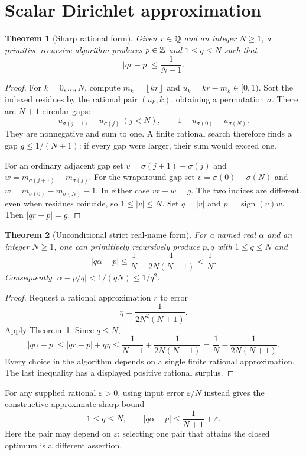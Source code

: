 \documentclass[11pt]{article}
\newtheorem{theorem}{Theorem}[section]
\theoremstyle{definition}\newtheorem{definition}[theorem]{Definition}
\theoremstyle{remark}\newtheorem{remark}[theorem]{Remark}
\newcommand{\floor}[1]{\left\lfloor#1\right\rfloor}
\begin{document}
\section{Scalar Dirichlet approximation}\label{sec:scalar}

\begin{theorem}[Sharp rational form]\label{thm:dir-rational}
Given $r\in\mathbb Q$ and an integer $N\ge1$, a primitive recursive algorithm produces $p\in\mathbb Z$ and $1\le q\le N$ such that
\[
 |qr-p|\le\frac1{N+1}.
\]
\end{theorem}
\begin{proof}
For $k=0,\ldots,N$, compute $m_k=\floor{kr}$ and $u_k=kr-m_k\in[0,1)$. Sort the indexed residues by the rational pair $(u_k,k)$, obtaining a permutation $\sigma$. There are $N+1$ circular gaps:
\[
 u_{\sigma(j+1)}-u_{\sigma(j)}\ (j<N),\qquad
 1+u_{\sigma(0)}-u_{\sigma(N)}.
\]
They are nonnegative and sum to one. A finite rational search therefore finds a gap $g\le1/(N+1)$: if every gap were larger, their sum would exceed one.

For an ordinary adjacent gap set $v=\sigma(j+1)-\sigma(j)$ and $w=m_{\sigma(j+1)}-m_{\sigma(j)}$. For the wraparound gap set $v=\sigma(0)-\sigma(N)$ and $w=m_{\sigma(0)}-m_{\sigma(N)}-1$. In either case $vr-w=g$. The two indices are different, even when residues coincide, so $1\le|v|\le N$. Set $q=|v|$ and $p=\operatorname{sign}(v)w$. Then $|qr-p|=g$.
\end{proof}

\begin{theorem}[Unconditional strict real-name form]\label{thm:dir-real}
For a named real $\alpha$ and an integer $N\ge1$, one can primitively recursively produce $p,q$ with $1\le q\le N$ and
\begin{equation}\label{eq:dir-surplus}
 |q\alpha-p|\le\frac1N-\frac1{2N(N+1)}<\frac1N.
\end{equation}
Consequently $|\alpha-p/q|<1/(qN)\le1/q^2$.
\end{theorem}
\begin{proof}
Request a rational approximation $r$ to error
\[
 \eta=\frac1{2N^2(N+1)}.
\]
Apply Theorem~\ref{thm:dir-rational}. Since $q\le N$,
\[
 |q\alpha-p|\le |qr-p|+q\eta
 \le\frac1{N+1}+\frac1{2N(N+1)}
 =\frac1N-\frac1{2N(N+1)}.
\]
Every choice in the algorithm depends on a single finite rational approximation. The last inequality has a displayed positive rational surplus.
\end{proof}

For any supplied rational $\varepsilon>0$, using input error $\varepsilon/N$ instead gives the constructive approximate sharp bound
\[
 1\le q\le N,\qquad |q\alpha-p|\le\frac1{N+1}+\varepsilon.
\]
Here the pair may depend on $\varepsilon$; selecting one pair that attains the closed optimum is a different assertion.
\end{document}
